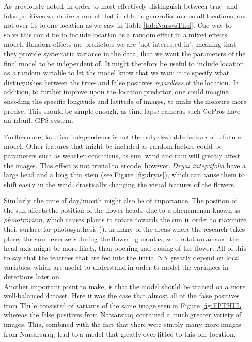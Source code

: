 \documentclass[12pt]{article}
\begin{document}
As previously noted, in order to most effectively distinguish between true- and false positives we desire a model that is able to generalise across all locations, and not over-fit to one location as we saw in Table \ref{tab:NarsvsThul}. One way to solve this could be to include location as a random effect in a mixed effects model. Random effects are predictors we are "not interested in", meaning that they provide systematic variance in the data, that we want the parameters of the final model to be independent of. It might therefore be useful to include location as a random variable to let the model know that we want it to specify what distinguishes between the true- and false positives \textit{regardless} of the location.  
In addition, to further improve upon the location predictor, one could imagine encoding the specific longitude and latitude of images, to make the measure more precise. This should be simple enough, as time-lapse cameras such GoPros have an inbuilt GPS system.

Furthermore, location independence is not the only desirable feature of a future model. Other features that might be included as random factors could be parameters such as weather conditions, as sun, wind and rain will greatly affect the images. This effect is not trivial to encode, however. \textit{Dryas integrifolia} have a large head and a long thin stem (see Figure \ref{fig:dryas}), which can cause them to shift easily in the wind, drastically changing the visual features of the flowers. 

Similarly, the time of day/month might also be of importance. The position of the sun affects the position of the flower heads, due to a phenomenon known as \textit{phototropism}, which causes plants to rotate towards the sun in order to maximize their surface for photosynthesis (\cite{evertRavenBiologyPlants2012}). In many of the areas where the research takes place, the sun never sets during the flowering months, so a rotation around the head axis might be more likely, than opening and closing of the flower. All of this to say that the features that are fed into the initial NN greatly depend on local variables, which are useful to understand in order to model the variances in detections later on.\\

Another important point to make, is that the model should be trained on a more well-balanced dataset. Here it was the case that almost all of the false positives from Thule consisted of variants of the same image seen in Figure \ref{fig:FPTHUL}, whereas the false positives from Narsarsuaq contained a much greater variety of images. This, combined with the fact that there were simply many more images from Narsarsuaq, lead to a model that greatly over-fitted to this one location.\\
\end{document}
